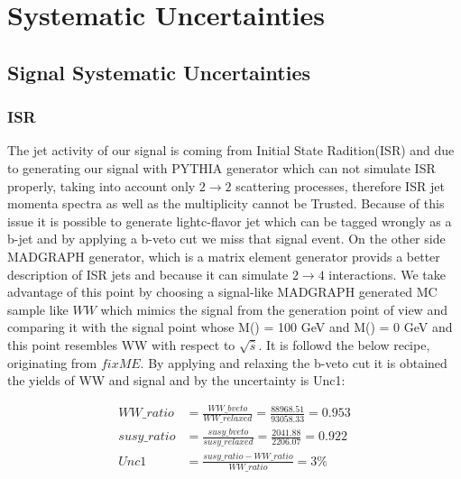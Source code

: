 \section{Systematic Uncertainties}
\label{sect:sys}
\subsection{Signal Systematic Uncertainties}
\subsubsection{ISR}
The jet activity of our signal is coming from Initial State Radition(ISR) and due to generating our signal with PYTHIA generator which can not simulate ISR properly, taking into account only $2 \rightarrow 2$ scattering processes, therefore ISR jet momenta spectra as well as the multiplicity cannot be Trusted. Because of this issue it is possible to generate lightc-flavor jet which can be tagged wrongly as a b-jet and by applying a b-veto cut we miss that signal event. On the other side MADGRAPH generator, which is a matrix element generator provids a better description of ISR jets and because it can simulate $2 \rightarrow 4$ interactions. 
We take advantage of this point by choosing a signal-like MADGRAPH generated MC sample like $WW$ which mimics the signal from the generation point of view and comparing it with the signal point whose M(\chione) = 100 GeV and M(\nuetraliono) = 0 GeV and this point resembles WW with respect to $\sqrt {\hat{s}}$. It is followd the below recipe, originating from $fixME$.
By applying and relaxing the b-veto cut it is obtained the yields of WW and signal and by the uncertainty is Unc1:


\begin{align}
WW\_ratio &= \frac{WW\_bveto}{WW\_relaxed} = \frac{88968.51}{93058.33} = 0.953\\ \nonumber
susy\_ratio &= \frac{susy\_bveto}{susy\_relaxed} = \frac{2041.88}{2206.07} = 0.922 \\ \nonumber
Unc1 &= \frac{susy\_ratio - WW\_ratio}{WW\_ratio} = 3 \% 
\end{align}


